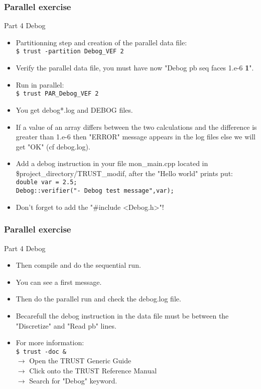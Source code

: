 \documentclass[10pt, hyperref={unicode=true,pdfusetitle, bookmarks=true,bookmarksnumbered=false,bookmarksopen=false, breaklinks=false,pdfborder={0 0 1},backref=true,colorlinks=true,linkcolor=darkblue,pageanchor, urlcolor=darkblue}]{beamer}
\begin{document}
\begin{frame}
\frametitle{Parallel exercise}
\begin{block}{Part 4 Debog}

\begin{itemize}
\item Partitionning step and creation of the parallel data file:\\
\texttt{\$ trust -partition Debog\_VEF 2 }\\
\item Verify the parallel data file, you must have now "Debog pb seq faces 1.e-6 \textbf{1}".
\item Run in parallel:\\
\texttt{\$ trust PAR\_Debog\_VEF 2 }\\
\item You get debog*.log and DEBOG files.
\item If a value of an array differs between the two calculations and the difference is greater than 1.e-6 then "ERROR" message appears in the log files else we will get "OK" (cf debog.log).\\

\item Add a debog instruction in your file mon\_main.cpp located in \$project\_directory/TRUST\_modif, after the "Hello world" prints put:\\
\texttt{double var = 2.5;}\\
\texttt{Debog::verifier("- Debog test message",var);}

\item Don't forget to add the "\#include <Debog.h>"!
\end{itemize}

\end{block}
\end{frame}
\begin{frame}
\frametitle{Parallel exercise}
\begin{block}{Part 4 Debog}

\begin{itemize}
\item Then compile and do the sequential run.
\item You can see a first message.
\item Then do the parallel run and check the debog.log file.
\item Becarefull the debog instruction in the data file must be between the "Discretize" and "Read pb" lines.
\item For more information:\\
\texttt{\$ trust -doc \&} \\
$\rightarrow$ Open the TRUST Generic Guide\\
$\rightarrow$ Click onto the TRUST Reference Manual\\
$\rightarrow$ Search for "Debog" keyword.
\end{itemize}

\end{block}
\end{frame}
\end{document}
